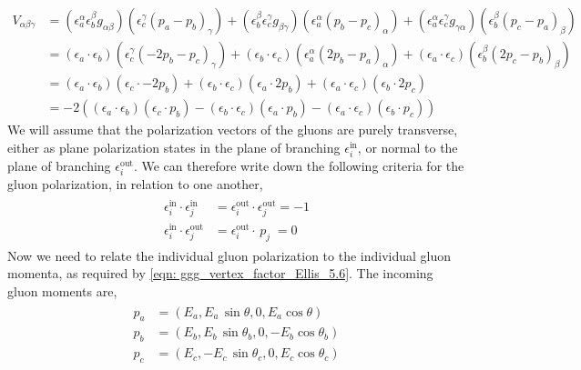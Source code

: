\documentclass[main.tex]{subfiles}
\begin{document}
\begin{align}\label{eqn: ggg_vertex_factor_Ellis_5.6}
    V_{\alpha\beta\gamma} &= 
    (\epsilon_a^\alpha \epsilon_b^\beta g_{\alpha\beta})(\epsilon_c^\gamma (p_a-p_b)_\gamma) + 
    (\epsilon_b^\beta \epsilon_c^\gamma g_{\beta\gamma})(\epsilon_a^\alpha (p_b-p_c)_\alpha) + 
    (\epsilon_a^\alpha \epsilon_c^\gamma g_{\gamma\alpha})(\epsilon_b^\beta (p_c-p_a)_\beta) \nonumber \\
    &=
    (\epsilon_a \cdot \epsilon_b)(\epsilon_c^\gamma (-2p_b- p_c)_\gamma) + 
    (\epsilon_b \cdot \epsilon_c)(\epsilon_a^\alpha (2p_b -p_a)_\alpha) + 
    (\epsilon_a \cdot \epsilon_c)(\epsilon_b^\beta (2p_c-p_b)_\beta) \nonumber \\
    &= 
    (\epsilon_a \cdot \epsilon_b)(\epsilon_c \cdot -2p_b) + 
    (\epsilon_b \cdot \epsilon_c)(\epsilon_a \cdot 2p_b) +
    (\epsilon_a \cdot \epsilon_c)(\epsilon_b \cdot 2p_c) \nonumber\\
    &= -2\left(
    (\epsilon_a \cdot \epsilon_b)(\epsilon_c \cdot p_b) - 
    (\epsilon_b \cdot \epsilon_c)(\epsilon_a \cdot p_b) -
    (\epsilon_a \cdot \epsilon_c)(\epsilon_b \cdot p_c) 
    \right)
\end{align}
We will assume that the polarization vectors of the gluons are purely transverse, either as plane polarization states in the plane of branching \(\epsilon_i^{\text{in}}\), or normal to the plane of branching \(\epsilon_i^{\text{out}}\). We can therefore write down the following criteria for the gluon polarization, in relation to one another,
\begin{align}\label{eqn: gluon_polarization_criteria_ellis_5.7}
    \begin{split}
    \epsilon_i^{\text{in}} \cdot \epsilon_j^{\text{in}} &= \epsilon_i^{\text{out}} \cdot \epsilon_j^{\text{out}} = -1  \\
    \epsilon_i^{\text{in}} \cdot \epsilon_j^{\text{out}} &= \epsilon_i^{\text{out}} \cdot \, p_j \; = 0
    \end{split}
\end{align}
Now we need to relate the individual gluon polarization to the individual gluon momenta, as required by \autoref{eqn: ggg_vertex_factor_Ellis_5.6}. The incoming gluon moments are,
\begin{align}\label{eqn: ggg_incoming_gluon_momentum}
    \begin{split}
    p_a &= \left( E_a, E_a \, \sin \theta, 0, E_a \cos \theta \right)  \\
    p_b &= \left( E_b, E_b \, \sin \theta_b, 0, -E_b \cos \theta_b \right) \\
    p_c &= \left( E_c, -E_c \, \sin \theta_c, 0, E_c \cos \theta_c \right) 
    \end{split}
\end{align}
\end{document}
